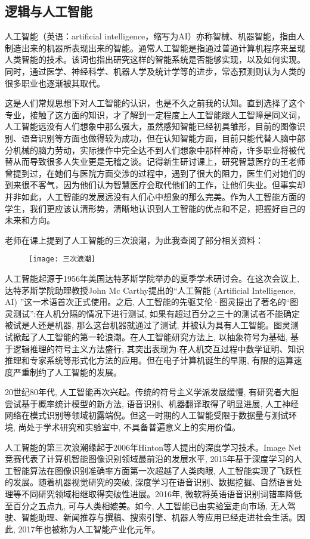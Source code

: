 \documentclass{article}
\begin{document}
\subsection{逻辑与人工智能}
人工智能（英语：artificial intelligence，缩写为AI）亦称智械、机器智能，指由人制造出来的机器所表现出来的智能。通常人工智能是指通过普通计算机程序来呈现人类智能的技术。该词也指出研究这样的智能系统是否能够实现，以及如何实现。同时，通过医学、神经科学、机器人学及统计学等的进步，常态预测则认为人类的很多职业也逐渐被其取代。 \citep{a1}\par
这是人们常规思想下对人工智能的认识，也是不久之前我的认知。直到选择了这个专业，接触了这方面的知识，才了解到一定程度上人工智能跟人工智障是同义词，人工智能远没有人们想象中那么强大，虽然感知智能已经初具雏形，目前的图像识别、语音识别等方面也做得较为成功，但在认知智能方面，目前只能代替人脑中部分机械的脑力劳动，实际操作中完全达不到人们想象中那样神奇，许多职业将被代替从而导致很多人失业更是无稽之谈。记得新生研讨课上，研究智慧医疗的王老师曾提到过，在她们与医院方面交涉的过程中，遇到了很大的阻力，医生们对她们的到来很不客气，因为他们认为智慧医疗会取代他们的工作，让他们失业。但事实却并非如此，人工智能的发展远没有人们心中想象的那么完美。作为人工智能方面的学生，我们更应该认清形势，清晰地认识到人工智能的优点和不足，把握好自己的未来和方向。\par
老师在课上提到了人工智能的三次浪潮，为此我查阅了部分相关资料：\par
\begin{figure}[H]
\centering
\texttt{[image: 三次浪潮]}
\label{fig:universe}
\end{figure}
人工智能起源于1956年美国达特茅斯学院举办的夏季学术研讨会。在这次会议上, 达特茅斯学院助理教授John Mc Carthy提出的“人工智能 (Artificial Intelligence, AI) ”这一术语首次正式使用。之后, 人工智能的先驱艾伦·图灵提出了著名的“图灵测试”:在人机分隔的情况下进行测试, 如果有超过百分之三十的测试者不能确定被试是人还是机器, 那么这台机器就通过了测试, 并被认为具有人工智能。图灵测试掀起了人工智能的第一轮浪潮。在人工智能研究方法上, 以抽象符号为基础, 基于逻辑推理的符号主义方法盛行, 其突出表现为:在人机交互过程中数学证明、知识推理和专家系统等形式化方法的应用。但在电子计算机诞生的早期, 有限的运算速度严重制约了人工智能的发展。 \par
20世纪80年代, 人工智能再次兴起。传统的符号主义学派发展缓慢, 有研究者大胆尝试基于概率统计模型的新方法, 语音识别、机器翻译取得了明显进展, 人工神经网络在模式识别等领域初露端倪。但这一时期的人工智能受限于数据量与测试环境, 尚处于学术研究和实验室中, 不具备普遍意义上的实用价值。\par
人工智能的第三次浪潮缘起于2006年Hinton等人提出的深度学习技术。Image Net竞赛代表了计算机智能图像识别领域最前沿的发展水平, 2015年基于深度学习的人工智能算法在图像识别准确率方面第一次超越了人类肉眼, 人工智能实现了飞跃性的发展。随着机器视觉研究的突破, 深度学习在语音识别、数据挖掘、自然语言处理等不同研究领域相继取得突破性进展。2016年, 微软将英语语音识别词错率降低至百分之五点九, 可与人类相媲美。如今, 人工智能已由实验室走向市场, 无人驾驶、智能助理、新闻推荐与撰稿、搜索引擎、机器人等应用已经走进社会生活。因此, 2017年也被称为人工智能产业化元年。\citep{a2}\par
\end{document}
